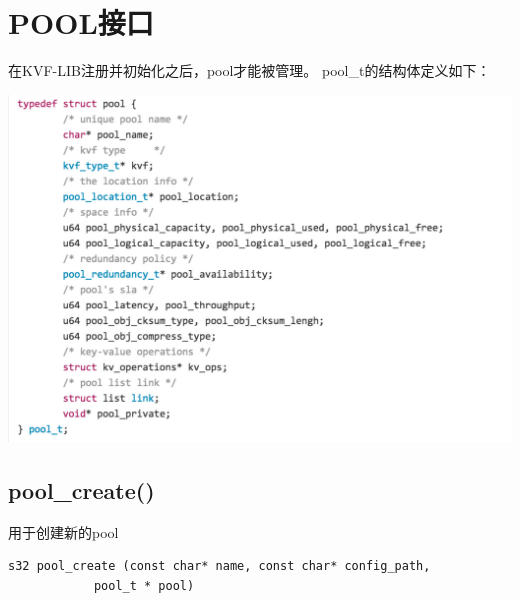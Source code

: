 
\section{POOL接口}
	在KVF-LIB注册并初始化之后，pool才能被管理。
	pool\_t的结构体定义如下：
	\begin{center}
		\includegraphics[width=13.9cm]{img/figure7.pdf}
	\end{center}
	\subsection{pool\_create()}
		用于创建新的pool
		\begin{Verbatim}[frame = none]
    s32 pool_create (const char* name, const char* config_path, 
		    pool_t * pool)	
		\end{Verbatim}

